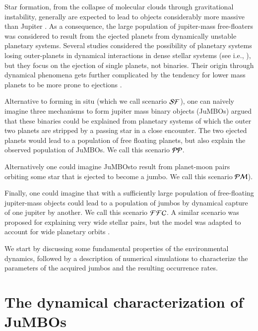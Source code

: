 \documentclass[aa]{lib/aa}
\newcommand{\jumbos}{\mbox{JuMBOs}}
\begin{document}
Star formation, from the collapse of molecular clouds through
gravitational instability, generally are expected to lead to objects
considerably more massive than Jupiter \citep{Low1976, Boyd2005}.  As
a consequence, the large population of jupiter-mass free-floaters was
considered to result from the ejected planets from dynamically
unstable planetary systems.  Several studies considered the
possibility of planetary systems losing outer-planets in dynamical
interactions in dense stellar systems (see i.e.,
\citet{1996Sci...274..954R,2015MNRAS.453.2759Z, 2017MNRAS.470.4337C,
  2019MNRAS.489.2280F, 2019A&A...624A.120V}), but they focus on the
ejection of single planets, not binaries.  Their origin through
dynamical phenomena gets further complicated by the tendency for lower
mass planets to be more prone to ejections \citep{Ford2001,
  2013MNRAS.433..867H,2019MNRAS.489.2280F,2020MNRAS.497.1807S}.

Alternative to forming in situ (which we call scenario ${\cal SF}$),
one can naively imagine three mechanisms to form jupiter mass binary
objects (\jumbos) \cite{2023arXiv231006016W} argued that these
binaries could be explained from planetary systems of which the outer
two planets are stripped by a passing star in a close encounter. The
two ejected planets would lead to a population of free floating
planets, but also explain the observed population of \jumbos.  We call
this scenario ${\cal PP}$.

Alternatively one could imagine \jumbos to result from planet-moon
pairs orbiting some star that is ejected to become a jumbo.  We call
this scenario ${\cal PM}$).

Finally, one could imagine that with a sufficiently large population
of free-floating jupiter-mass objects could lead to a population of
jumbos by dynamical capture of one jupiter by another.  We call this
scenario ${\cal FFC}$. A similar scenario was proposed
\cite{2010MNRAS.404.1835K,} for explaining very wide stellar pairs,
but the model was adapted to account for wide planetary orbits
\cite{2012ApJ...750...83P}.

We start by discussing some fundamental properties of the
environmental dynamics, followed by a description of numerical
simulations to characterize the parameters of the acquired jumbos and
the resulting occurrence rates.

\section{The dynamical characterization of \jumbos}
\end{document}
